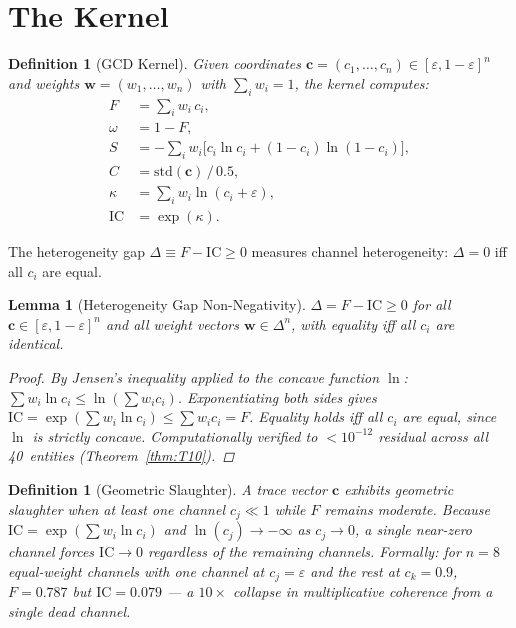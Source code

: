 \documentclass[
  aps,
  prd,
  twocolumn,
  superscriptaddress,
  nofootinbib,
  floatfix
]{revtex4-2}
\newtheorem{definition}[theorem]{Definition}
\newtheorem{lemma}[theorem]{Lemma}
\newcommand{\eps}{\varepsilon}
\newcommand{\tvec}{\mathbf{c}}
\newcommand{\wvec}{\mathbf{w}}
\newcommand{\IC}{\mathrm{IC}}
\begin{document}
\section{The Kernel}\label{sec:kernel}

\begin{definition}[GCD Kernel]\label{def:kernel}
Given coordinates $\tvec = (c_1, \ldots, c_n) \in
[\eps, 1{-}\eps]^n$ and weights $\wvec = (w_1, \ldots, w_n)$
with $\sum_i w_i = 1$, the kernel computes:
\begin{align}
  F &= \textstyle\sum_i w_i \, c_i, \label{eq:F} \\
  \omega &= 1 - F, \label{eq:omega} \\
  S &= -\textstyle\sum_i w_i \bigl[c_i \ln c_i
    + (1{-}c_i)\ln(1{-}c_i)\bigr], \label{eq:S} \\
  C &= \mathrm{std}(\tvec)\,/\,0.5, \label{eq:C} \\
  \kappa &= \textstyle\sum_i w_i \ln(c_i + \eps), \label{eq:kappa} \\
  \IC &= \exp(\kappa). \label{eq:IC}
\end{align}
\end{definition}

The heterogeneity gap $\Delta \equiv F - \IC \geq 0$ measures
channel heterogeneity: $\Delta = 0$ iff all $c_i$ are equal.

\begin{lemma}[Heterogeneity Gap Non-Negativity]\label{lem:gap}
$\Delta = F - \IC \geq 0$ for all $\tvec \in [\eps, 1{-}\eps]^n$
and all weight vectors $\wvec \in \Delta^n$, with equality iff
all $c_i$ are identical.
\begin{proof}
By Jensen's inequality applied to the concave function
$\ln$: $\sum w_i \ln c_i \leq \ln(\sum w_i c_i)$.
Exponentiating both sides gives
$\IC = \exp(\sum w_i \ln c_i) \leq \sum w_i c_i = F$.
Equality holds iff all $c_i$ are equal, since $\ln$ is
strictly concave.  Computationally verified to $< 10^{-12}$
residual across all 40~entities (Theorem~\ref{thm:T10}).
\end{proof}
\end{lemma}

\begin{definition}[Geometric Slaughter]\label{def:slaughter}
A trace vector $\tvec$ exhibits \emph{geometric slaughter}
when at least one channel $c_j \ll 1$ while $F$ remains
moderate.  Because $\IC = \exp(\sum w_i \ln c_i)$ and
$\ln(c_j) \to -\infty$ as $c_j \to 0$, a single
near-zero channel forces $\IC \to 0$ regardless of the
remaining channels.  Formally: for $n = 8$ equal-weight
channels with one channel at $c_j = \eps$ and the rest at
$c_k = 0.9$, $F = 0.787$ but $\IC = 0.079$ ---
a $10\times$ collapse in multiplicative coherence from a
single dead channel.
\end{definition}
\end{document}

